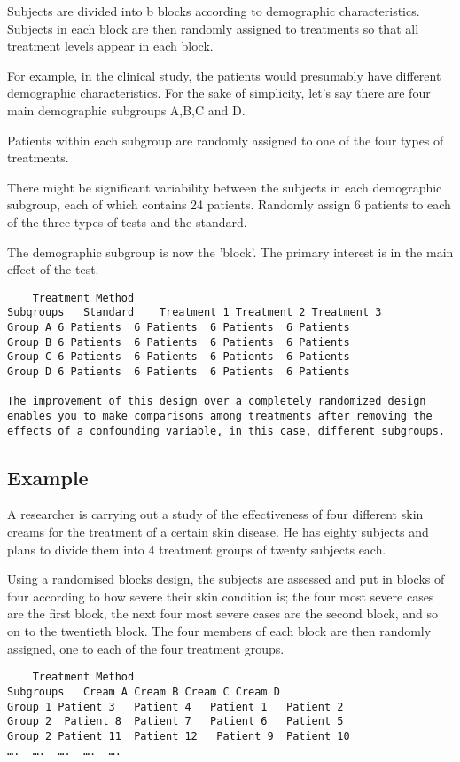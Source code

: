 \documentclass[a4paper,12pt]{article}
\begin{document}
Subjects are divided into b blocks according to demographic characteristics. Subjects in each block are then randomly assigned to treatments so that all treatment levels appear in each block. 

For example, in the clinical study, the patients would presumably have different demographic characteristics. For the sake of simplicity, let’s say there are four main demographic subgroups A,B,C and D. 

Patients within each subgroup are randomly assigned to one of the four types of treatments. 

There might be significant variability between the subjects in each demographic subgroup, each of which contains 24 patients. Randomly assign 6 patients to each of the three types of tests and the standard. 

The demographic subgroup is now the 'block'. The primary interest is in the main effect of the test.

\begin{verbatim}
	Treatment Method
Subgroups	Standard	Treatment 1	Treatment 2	Treatment 3
Group A	6 Patients	6 Patients	6 Patients	6 Patients
Group B	6 Patients	6 Patients	6 Patients	6 Patients
Group C	6 Patients	6 Patients	6 Patients	6 Patients
Group D	6 Patients	6 Patients	6 Patients	6 Patients

The improvement of this design over a completely randomized design enables you to make comparisons among treatments after removing the effects of a confounding variable, in this case, different subgroups.
\end{verbatim}

\subsection{Example} 
A researcher is carrying out a study of the effectiveness of four different skin creams for the treatment of a certain skin disease. He has eighty subjects and plans to divide them into 4 treatment groups of twenty subjects each. 

Using a randomised blocks design, the subjects are assessed and put in blocks of four according to how severe their skin condition is; the four most severe cases are the first block, the next four most severe cases are the second block, and so on to the twentieth block. The four members of each block are then randomly assigned, one to each of the four treatment groups.

\begin{verbatim}
	Treatment Method
Subgroups	Cream A	Cream B	Cream C	Cream D
Group 1	Patient 3	Patient 4	Patient 1	Patient 2
Group 2	 Patient 8	Patient 7	Patient 6	Patient 5
Group 2	Patient 11	Patient 12	 Patient 9	Patient 10
….	….	….	….	….
\end{verbatim}
\end{document}
